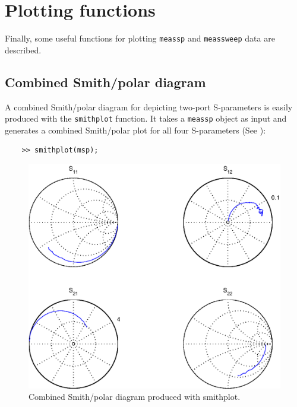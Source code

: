 %

\section{Plotting functions}
Finally, some useful functions for plotting \verb"meassp" and
\verb"meassweep" data are described.

\subsection{Combined Smith/polar diagram}
A combined Smith/polar diagram for depicting two-port S-parameters
is easily produced with the \verb"smithplot" function. It takes a
\verb"meassp" object as input and generates a combined Smith/polar
plot for all four S-parameters (See ):
\begin{small}
\begin{verbatim}
    >> smithplot(msp);
\end{verbatim}
\end{small}

\begin{figure}[htbf]
    \centering
  \includegraphics[scale=0.6]{Figures/Smith.eps}
  \caption{Combined Smith/polar diagram produced with smithplot.}\label{fig:Smith}
\end{figure}

